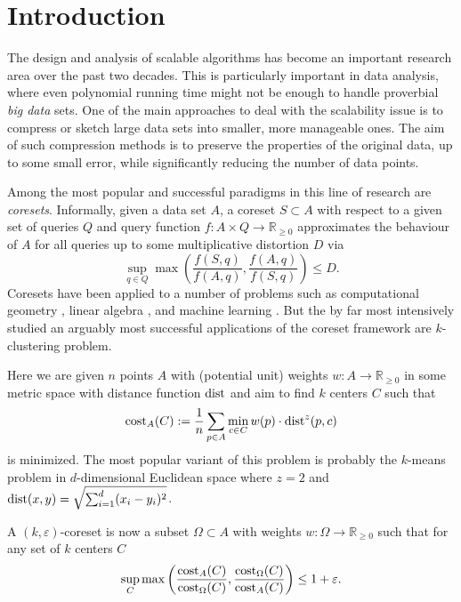 \section{Introduction}

The design and analysis of scalable algorithms has become an important research area over the past two decades. This is particularly important in data analysis, where even polynomial running time might not be enough to handle proverbial \emph{big data} sets.
One of the main approaches to deal with the scalability issue is to compress or sketch large data sets into smaller, more manageable ones. The aim of such compression methods is to preserve the properties of the original data, up to some small error, while significantly reducing the number of data points.

Among the most popular and successful paradigms in this line of research are \emph{coresets}. Informally, given a data set $A$, a coreset $S\subset A$ with respect to a given set of queries $Q$ and query function $f: A\times Q \rightarrow \mathbb{R}_{\geq 0}$ approximates the behaviour of $A$ for all queries up to some multiplicative distortion $D$ via
$$ \sup_{q\in Q} \max\left( \frac{f(S,q)}{f(A,q)},\frac{f(A,q)}{f(S,q)}\right) \leq D.$$
Coresets have been applied to a number of problems such as computational geometry \cite{AHV05,Chan09}, linear algebra \cite{IndykMGR20,maalouf2019fast}, and machine learning \cite{MRM21,MunteanuSSW18}. But the by far most intensively studied an arguably most successful applications of the coreset framework are $k$-clustering problem.

Here we are given $n$ points $A$ with (potential unit) weights $w:A\rightarrow \mathbb{R}_{\geq 0}$ in some metric space with distance function $\text{dist}$ and aim to find $k$ centers $C$ such that 
$$\text{cost}_A(C):= \frac{1}{n} \sum_{p\in A}  \min_{c\in C} w(p)\cdot \text{dist}^z(p,c)$$
is minimized. The most popular variant of this problem is probably the $k$-means problem in $d$-dimensional Euclidean space where $z=2$ and $\text{dist}(x,y) = \sqrt{\sum_{i=1}^d (x_i-y_i)^2}$.

A $(k,\varepsilon)$-coreset is now a subset $\Omega\subset A$ with weights $w:\Omega\rightarrow \mathbb{R}_{\geq 0}$ such that for any set of $k$ centers $C$
\begin{equation}
\label{eq:coreset}
\sup_{C} \max\left( \frac{\text{cost}_A(C)}{\text{cost}_{\Omega}(C)},\frac{\text{cost}_{\Omega}(C)}{\text{cost}_{A}(C)}\right) \leq 1+\varepsilon.
\end{equation}

